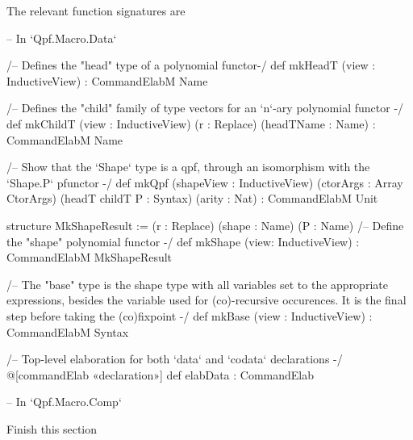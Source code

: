 The relevant function signatures are
\begin{leancode}
-- In `Qpf.Macro.Data`

  /-- Defines the "head" type of a polynomial functor-/
  def mkHeadT (view : InductiveView) : CommandElabM Name

  /-- Defines the "child" family of type vectors for an `n`-ary polynomial functor -/
  def mkChildT (view : InductiveView) (r : Replace) (headTName : Name)
               : CommandElabM Name

  /-- Show that the `Shape` type is a qpf, through an isomorphism with the 
      `Shape.P` pfunctor -/
  def mkQpf (shapeView : InductiveView) (ctorArgs : Array CtorArgs) 
            (headT childT P : Syntax) (arity : Nat) 
            : CommandElabM Unit    


  structure MkShapeResult := (r : Replace) (shape : Name) (P : Name)
  /-- Define the "shape" polynomial functor -/
  def mkShape (view: InductiveView) : CommandElabM MkShapeResult


  /-- The "base" type is the shape type with all variables set to the appropriate
      expressions, besides the variable used for (co)-recursive occurences.
      It is the final step before taking the (co)fixpoint -/
  def mkBase (view : InductiveView) : CommandElabM Syntax


  /-- Top-level elaboration for both `data` and `codata` declarations -/
  @[commandElab «declaration»] def elabData : CommandElab

-- In `Qpf.Macro.Comp`
\end{leancode}


\begin{todo}
    Finish this section
\end{todo}
